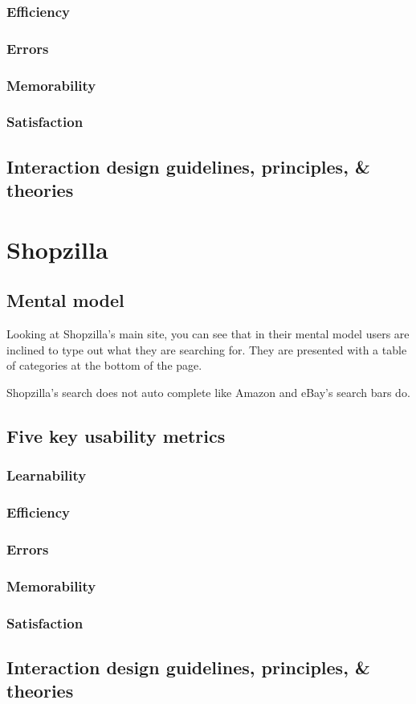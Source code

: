 \documentclass[11pt, oneside]{article}
\begin{document}
\subsubsection{Efficiency}
\subsubsection{Errors}
\subsubsection{Memorability}
\subsubsection{Satisfaction}

\subsection{Interaction design guidelines, principles, \& theories}

\pagebreak

\section{Shopzilla}

\subsection{Mental model}

Looking at Shopzilla's main site, you can see that in their mental model users are inclined to type out what they are searching for. They are presented with a table of categories at the bottom of the page.

Shopzilla's search does not auto complete like Amazon and eBay's search bars do.

\subsection{Five key usability metrics}
\subsubsection{Learnability}
\subsubsection{Efficiency}
\subsubsection{Errors}
\subsubsection{Memorability}
\subsubsection{Satisfaction}

\subsection{Interaction design guidelines, principles, \& theories}
\end{document}
